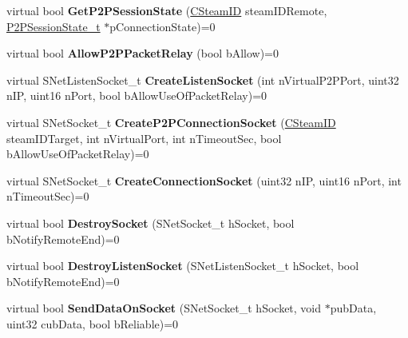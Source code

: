 \begin{DoxyCompactItemize}
\item 
\mbox{\label{class_i_steam_networking_af78aecf5a699774a72f1440b1b32a7ad}} 
virtual bool {\bfseries Get\+P2\+P\+Session\+State} (\hyperlink{class_c_steam_i_d}{C\+Steam\+ID} steam\+I\+D\+Remote, \hyperlink{struct_p2_p_session_state__t}{P2\+P\+Session\+State\+\_\+t} $\ast$p\+Connection\+State)=0
\item 
\mbox{\label{class_i_steam_networking_a374e6634e1561faada8a7e3d057b2803}} 
virtual bool {\bfseries Allow\+P2\+P\+Packet\+Relay} (bool b\+Allow)=0
\item 
\mbox{\label{class_i_steam_networking_abf79b7d6e2a497f1b72d25df40cc5f4c}} 
virtual S\+Net\+Listen\+Socket\+\_\+t {\bfseries Create\+Listen\+Socket} (int n\+Virtual\+P2\+P\+Port, uint32 n\+IP, uint16 n\+Port, bool b\+Allow\+Use\+Of\+Packet\+Relay)=0
\item 
\mbox{\label{class_i_steam_networking_a6fd47853762ab39910616544cedc13e4}} 
virtual S\+Net\+Socket\+\_\+t {\bfseries Create\+P2\+P\+Connection\+Socket} (\hyperlink{class_c_steam_i_d}{C\+Steam\+ID} steam\+I\+D\+Target, int n\+Virtual\+Port, int n\+Timeout\+Sec, bool b\+Allow\+Use\+Of\+Packet\+Relay)=0
\item 
\mbox{\label{class_i_steam_networking_a5a9ce6ba68b44aed70a7221ef97a0783}} 
virtual S\+Net\+Socket\+\_\+t {\bfseries Create\+Connection\+Socket} (uint32 n\+IP, uint16 n\+Port, int n\+Timeout\+Sec)=0
\item 
\mbox{\label{class_i_steam_networking_abdbfec12b11db46d7b61a88c8df81bd5}} 
virtual bool {\bfseries Destroy\+Socket} (S\+Net\+Socket\+\_\+t h\+Socket, bool b\+Notify\+Remote\+End)=0
\item 
\mbox{\label{class_i_steam_networking_ade35fbe2b04ff79e7ad536d8a7c4f2d3}} 
virtual bool {\bfseries Destroy\+Listen\+Socket} (S\+Net\+Listen\+Socket\+\_\+t h\+Socket, bool b\+Notify\+Remote\+End)=0
\item 
\mbox{\label{class_i_steam_networking_a88151472eeed9395e0352eaa198375e9}} 
virtual bool {\bfseries Send\+Data\+On\+Socket} (S\+Net\+Socket\+\_\+t h\+Socket, void $\ast$pub\+Data, uint32 cub\+Data, bool b\+Reliable)=0

\end{DoxyCompactItemize}
